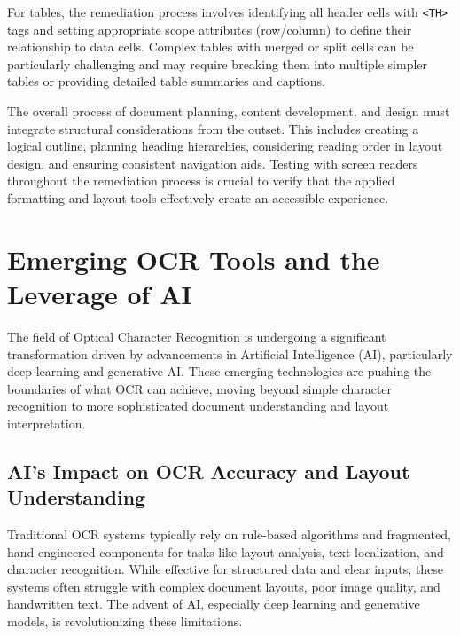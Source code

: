 For tables, the remediation process involves identifying all header cells with \texttt{<TH>} tags and setting appropriate scope attributes (row/column) to define their relationship to data cells. \cite{UWDocInfo, DevToPDFStructure} Complex tables with merged or split cells can be particularly challenging and may require breaking them into multiple simpler tables or providing detailed table summaries and captions. \cite{UWDocInfo, DevToPDFStructure}

The overall process of document planning, content development, and design must integrate structural considerations from the outset. This includes creating a logical outline, planning heading hierarchies, considering reading order in layout design, and ensuring consistent navigation aids. \cite{DevToPDFStructure} Testing with screen readers throughout the remediation process is crucial to verify that the applied formatting and layout tools effectively create an accessible experience. \cite{DevToPDFStructure}

\section{Emerging OCR Tools and the Leverage of AI}
\label{sec:ocr-ai-tools}

\vspace{1em}

The field of Optical Character Recognition is undergoing a significant transformation driven by advancements in Artificial Intelligence (AI), particularly deep learning and generative AI. These emerging technologies are pushing the boundaries of what OCR can achieve, moving beyond simple character recognition to more sophisticated document understanding and layout interpretation.

\subsection{AI's Impact on OCR Accuracy and Layout Understanding}

Traditional OCR systems typically rely on rule-based algorithms and fragmented, hand-engineered components for tasks like layout analysis, text localization, and character recognition. \cite{AddeptoAIOCR} \cite{BeyondKeyAIOCR} While effective for structured data and clear inputs, these systems often struggle with complex document layouts, poor image quality, and handwritten text. \cite{AddeptoAIOCR} \cite{BeyondKeyAIOCR} The advent of AI, especially deep learning and generative models, is revolutionizing these limitations.


